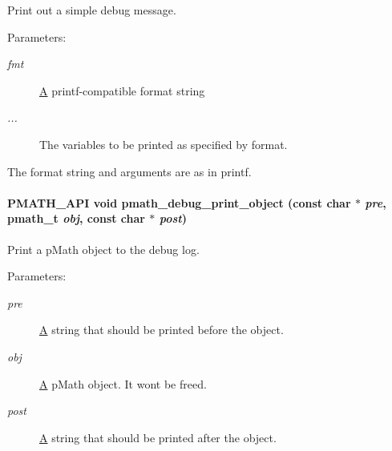 Print out a simple debug message. 

\begin{Desc}
\item[Parameters:]
\begin{description}
\item[{\em fmt}]\hyperlink{class_a}{A} printf-compatible format string \item[{\em ...}]The variables to be printed as specified by format.\end{description}
\end{Desc}
The format string and arguments are as in printf. \hypertarget{group__debug_g05424b6252f7de0e25b31aa10328c64a}{
\paragraph[{pmath\_\-debug\_\-print\_\-object}]{\setlength{\rightskip}{0pt plus 5cm}PMATH\_\-API void pmath\_\-debug\_\-print\_\-object (const char $\ast$ {\em pre}, \/  {\bf pmath\_\-t} {\em obj}, \/  const char $\ast$ {\em post})}\hfill}
\label{group__debug_g05424b6252f7de0e25b31aa10328c64a}


Print a pMath object to the debug log. 

\begin{Desc}
\item[Parameters:]
\begin{description}
\item[{\em pre}]\hyperlink{class_a}{A} string that should be printed before the object. \item[{\em obj}]\hyperlink{class_a}{A} pMath object. It wont be freed. \item[{\em post}]\hyperlink{class_a}{A} string that should be printed after the object. \end{description}
\end{Desc}
